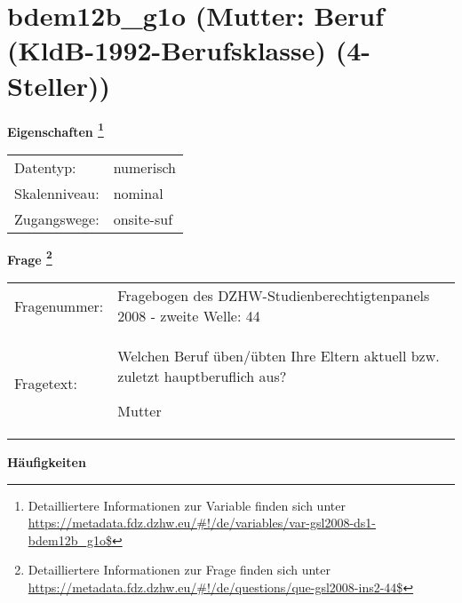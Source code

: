 
    \setcounter{footnote}{0}

    \vspace*{-1.8cm}
	\section{bdem12b\_g1o (Mutter: Beruf (KldB-1992-Berufsklasse) (4-Steller))}
	\label{section:bdem12b_g1o}



    \vspace*{0.5cm}
    \noindent\textbf{Eigenschaften
	\footnote{Detailliertere Informationen zur Variable finden sich unter
		\url{https://metadata.fdz.dzhw.eu/\#!/de/variables/var-gsl2008-ds1-bdem12b_g1o$}}}\\
	\begin{tabularx}{\hsize}{@{}lX}
	Datentyp: & numerisch \\
	Skalenniveau: & nominal \\
	Zugangswege: &
	  onsite-suf
 \\
    \end{tabularx}



				\vspace*{0.5cm}
                \noindent\textbf{Frage
	                \footnote{Detailliertere Informationen zur Frage finden sich unter
		              \url{https://metadata.fdz.dzhw.eu/\#!/de/questions/que-gsl2008-ins2-44$}}}\\
				\begin{tabularx}{\hsize}{@{}lX}
					Fragenummer: &
					  Fragebogen des DZHW-Studienberechtigtenpanels 2008 - zweite Welle:
					  44
 \\
					Fragetext: & Welchen Beruf üben/übten Ihre Eltern aktuell bzw. zuletzt hauptberuflich aus?\par  Mutter \\
				\end{tabularx}





        		\vspace*{0.5cm}
                \noindent\textbf{Häufigkeiten}

